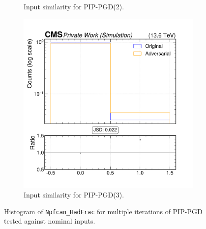 \begin{figure}[htbp]
\begin{subfigure}[t]{0.32\textwidth}
    \caption*{Input similarity for PIP-PGD(2).}
  \end{subfigure}\hfill
  \begin{subfigure}[t]{0.32\textwidth}
    \includegraphics[width=\linewidth]{media/output/features/compare/combined_it_3/cmp_npf_arr_Npfcan_HadFrac.pdf}
    \caption*{Input similarity for PIP-PGD(3).}
  \end{subfigure}

  \caption*{Histogram of \texttt{Npfcan\_HadFrac} for multiple iterations of PIP-PGD tested against nominal inputs.}
  \label{fig:combined_input_Npfcan_HadFrac}
\end{figure}

